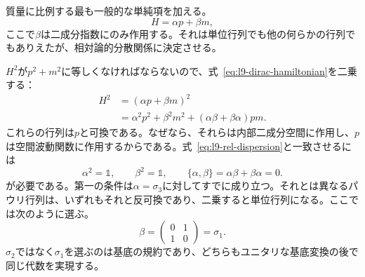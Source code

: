質量に比例する最も一般的な単純項を加える。
\begin{equation}
H=\alpha p+\beta m,
\label{eq:l9-dirac-hamiltonian}
\end{equation}
ここで\(\beta\)は二成分指数にのみ作用する。それは単位行列でも他の何らかの行列でもありえたが、相対論的分散関係に決定させる。

\(H^2\)が\(p^2+m^2\)に等しくなければならないので、式~\eqref{eq:l9-dirac-hamiltonian}を二乗する：
\begin{align}
H^2
&=(\alpha p+\beta m)^2\\
&=\alpha^2p^2+\beta^2m^2
+(\alpha\beta+\beta\alpha)pm.
\label{eq:l9-square-dirac}
\end{align}
これらの行列は\(p\)と可換である。なぜなら、それらは内部二成分空間に作用し、\(p\)は空間波動関数に作用するからである。式~\eqref{eq:l9-rel-dispersion}と一致させるには
\begin{equation}
\alpha^2=\mathbb{1},
\qquad
\beta^2=\mathbb{1},
\qquad
\{\alpha,\beta\}
=\alpha\beta+\beta\alpha=0.
\label{eq:l9-dirac-algebra}
\end{equation}
が必要である。第一の条件は\(\alpha=\sigma_3\)に対してすでに成り立つ。それとは異なるパウリ行列は、いずれもそれと反可換であり、二乗すると単位行列になる。ここでは次のように選ぶ。
\begin{equation}
\beta=
\begin{pmatrix}
0&1\\
1&0
\end{pmatrix}
=\sigma_1.
\label{eq:l9-beta}
\end{equation}
\(\sigma_2\)ではなく\(\sigma_1\)を選ぶのは基底の規約であり、どちらもユニタリな基底変換の後で同じ代数を実現する。

\begin{classroomqa}
\end{classroomqa}

\begin{classroomqa}
\end{classroomqa}

